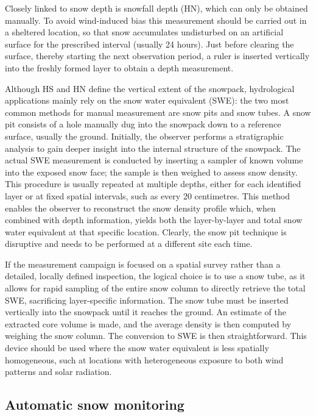 Closely linked to snow depth is snowfall depth (HN), which can only be obtained manually. To avoid wind-induced bias this measurement should 
be carried out in a sheltered location, so that snow accumulates undisturbed on an artificial surface for the prescribed interval (usually 24 hours). 
Just before clearing the surface, thereby starting the next observation period, a ruler is inserted vertically into the freshly formed layer to 
obtain a depth measurement.

Although HS and HN define the vertical extent of the snowpack, hydrological applications mainly rely on the snow water equivalent (SWE): the 
two most common methods for manual measurement are snow pits and snow tubes. A snow pit consists of a hole manually dug into the snowpack down to a 
reference surface, usually the ground. Initially, the observer performs a stratigraphic analysis to gain deeper insight into the internal structure 
of the snowpack. The actual SWE measurement is conducted by inserting a sampler of known volume into the exposed snow face; the sample 
is then weighed to assess snow density. This procedure is usually repeated at multiple depths, either for each identified layer or at fixed spatial 
intervals, such as every 20 centimetres. This method enables the observer to reconstruct the snow density profile which, when combined with depth 
information, yields both the layer-by-layer and total snow water equivalent at that specific location. Clearly, the snow pit technique is disruptive 
and needs to be performed at a different site each time. 

If the measurement campaign is focused on a spatial survey rather than a detailed, locally 
defined inspection, the logical choice is to use a snow tube, as it allows for rapid sampling of the entire snow column to directly retrieve the total 
SWE, sacrificing layer-specific information. The snow tube must be inserted vertically into the snowpack until it reaches the ground. An estimate of 
the extracted core volume is made, and the average density is then computed by weighing the snow column. The conversion to SWE is then straightforward. 
This device should be used where the snow water equivalent is less spatially homogeneous, such at locations with heterogeneous exposure to both wind 
patterns and solar radiation.



\subsection{Automatic snow monitoring}


